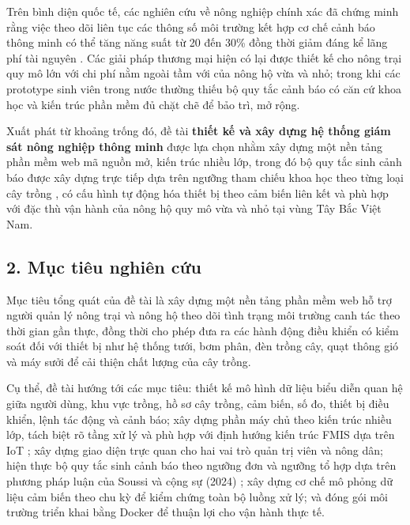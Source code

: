 \documentclass[13pt,a4paper]{extarticle}
\numberwithin{figure}{section}
\numberwithin{table}{section}
\begin{document}
	Trên bình diện quốc tế, các nghiên cứu về nông nghiệp chính xác đã chứng minh rằng việc theo dõi liên tục các thông số môi trường kết hợp cơ chế cảnh báo thông minh có thể tăng năng suất từ 20 đến 30\% đồng thời giảm đáng kể lãng phí tài nguyên \cite{soussi2024}. Các giải pháp thương mại hiện có lại được thiết kế cho nông trại quy mô lớn với chi phí nằm ngoài tầm với của nông hộ vừa và nhỏ; trong khi các prototype sinh viên trong nước thường thiếu bộ quy tắc cảnh báo có căn cứ khoa học và kiến trúc phần mềm đủ chặt chẽ để bảo trì, mở rộng.
	
	Xuất phát từ khoảng trống đó, đề tài \textbf{thiết kế và xây dựng hệ thống giám sát nông nghiệp thông minh } được lựa chọn nhằm xây dựng một nền tảng phần mềm web mã nguồn mở, kiến trúc nhiều lớp, trong đó bộ quy tắc sinh cảnh báo được xây dựng trực tiếp dựa trên ngưỡng tham chiếu khoa học theo từng loại cây trồng \cite{soussi2024}, có cấu hình tự động hóa thiết bị theo cảm biến liên kết và phù hợp với đặc thù vận hành của nông hộ quy mô vừa và nhỏ tại vùng Tây Bắc Việt Nam.
	
	\subsection*{2. Mục tiêu nghiên cứu}
	
	Mục tiêu tổng quát của đề tài là xây dựng một nền tảng phần mềm web hỗ trợ người quản lý nông trại và nông hộ theo dõi tình trạng môi trường canh tác theo thời gian gần thực, đồng thời cho phép đưa ra các hành động điều khiển có kiểm soát đối với thiết bị như hệ thống tưới, bơm phân, đèn trồng cây, quạt thông gió và máy sưởi để cải thiện chất lượng của cây trồng.
	
	Cụ thể, đề tài hướng tới các mục tiêu: thiết kế mô hình dữ liệu biểu diễn quan hệ giữa người dùng, khu vực trồng, hồ sơ cây trồng, cảm biến, số đo, thiết bị điều khiển, lệnh tác động và cảnh báo; xây dựng phần máy chủ theo kiến trúc nhiều lớp, tách biệt rõ tầng xử lý và phù hợp với định hướng kiến trúc FMIS dựa trên IoT \cite{koksal2019}; xây dựng giao diện trực quan cho hai vai trò quản trị viên và nông dân; hiện thực bộ quy tắc sinh cảnh báo theo ngưỡng đơn và ngưỡng tổ hợp dựa trên phương pháp luận của Soussi và cộng sự (2024) \cite{soussi2024}; xây dựng cơ chế mô phỏng dữ liệu cảm biến theo chu kỳ để kiểm chứng toàn bộ luồng xử lý; và đóng gói môi trường triển khai bằng Docker để thuận lợi cho vận hành thực tế.
	
\end{document}
